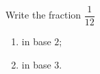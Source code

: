 Write the fraction $\dfrac{1}{12}$
\begin{enumerate}
\item[(a)] in base $2$;
\item[(b)] in base $3$.
\end{enumerate}
